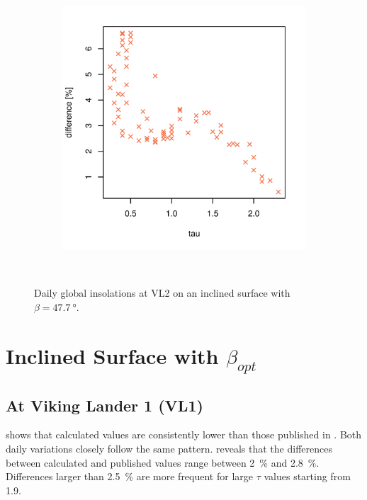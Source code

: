 \begin{figure}[h]
\begin{subfigure}[t]{\subfigureWidth}
            \includegraphics[height=\graphicsHeight]{sections/appendix/insolation-calculation-verification/plots/h-diff-bet-exp-calc-at-vl2-with-beta-477-deg.png}
            \label{fig:sub:comparative-global-insolation-at-vl2-beta-equals-phi-percentage-differences}
    \end{subfigure}\\[0.8ex]
    \caption[Daily global insolations at Viking Lander 2 on an inclined surface with $\beta=\SI{47.7}{\degree}$]
    {Daily global insolations at \ac{VL2} on an inclined surface with $\beta=\SI{47.7}{\degree}$.}
    \label{fig:plot:comparative-global-insolation-at-vl2-beta-equals-phi}
\vspace{-2ex}
\end{figure}

\section{Inclined Surface with $\beta_{opt}$}
\subsection{At Viking Lander 1 (VL1)}
 shows that calculated values are consistently lower than those published in . Both daily variations closely follow the same pattern.  reveals that the differences between calculated and published values range between \SI{2}{\percent} and \SI{2.8}{\percent}. Differences larger than \SI{2.5}{\percent} are more frequent for large $\tau$ values starting from 1.9.

